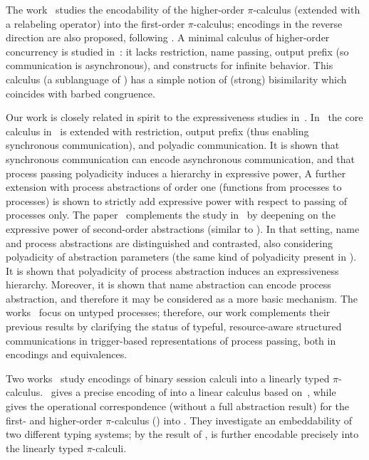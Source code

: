 The work~\cite{XuActa2012} studies the encodability of the higher-order $\pi$-calculus (extended with a relabeling operator) into the first-order $\pi$-calculus; encodings in the reverse direction are also proposed, following \cite{Tho90}.
A minimal calculus of higher-order concurrency is studied in~\cite{DBLP:journals/iandc/LanesePSS11}: it lacks restriction,  name passing, output prefix (so  communication is asynchronous), and constructs for infinite behavior. 
This calculus (a sublanguage of \HO) has 
a simple notion of (strong) bisimilarity which coincides with barbed congruence.

Our work is closely related in spirit to the expressiveness studies in~\cite{DBLP:conf/icalp/LanesePSS10,DBLP:conf/wsfm/XuYL13}.
In~\cite{DBLP:conf/icalp/LanesePSS10}
the core calculus in~\cite{DBLP:journals/iandc/LanesePSS11} is extended with restriction, output prefix (thus enabling synchronous communication), 
and polyadic communication. It is shown that 
synchronous communication can encode asynchronous communication, %
and that process passing polyadicity induces a hierarchy in expressive power, %
A further extension with process abstractions of order one
(functions from processes to processes)
 is shown to strictly add expressive power with respect to passing of processes only.
The paper~\cite{DBLP:conf/wsfm/XuYL13} complements the study in~\cite{DBLP:conf/icalp/LanesePSS10} by deepening on the expressive power of second-order abstractions (similar to \HO). 
In that setting, name and process abstractions are distinguished and contrasted, also considering polyadicity of abstraction parameters (the same kind of polyadicity present in \pHOp). It is shown that polyadicity of process abstraction induces an expressiveness hierarchy. Moreover, it is shown that name abstraction can encode process abstraction, and therefore it may be considered as a more basic mechanism. 
The works~\cite{DBLP:conf/icalp/LanesePSS10,DBLP:conf/wsfm/XuYL13} focus on untyped processes;
therefore, our work complements their previous results by clarifying the status of typeful, resource-aware structured communications in
trigger-based representations of process passing, both in encodings and  equivalences.

Two works~\cite{DemangeonH11,Dardha:2012:STR:2370776.2370794} 
study encodings of binary session calculi into 
a linearly typed $\pi$-calculus. 
\cite{DemangeonH11}~gives a precise encoding of \sessp into a linear calculus 
based on~\cite{BHY},  
while~\cite{Dardha:2012:STR:2370776.2370794} 
gives the operational correspondence 
(without a full abstraction result)
for the first- and higher-order 
$\pi$-calculus (\cite{tlca07}) into \cite{LinearPi}. 
They investigate an embeddability of two different typing systems;
by the result of \cite{DemangeonH11}, \HOpp is further encodable precisely 
into the linearly typed $\pi$-calculi.     

